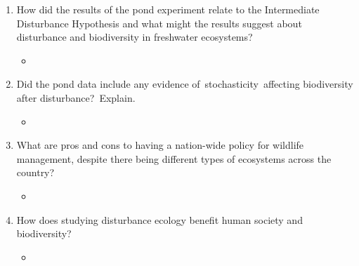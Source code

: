 \documentclass{article}
\begin{document}
\begin{enumerate}
  \item How did the results of the pond experiment relate to the Intermediate Disturbance Hypothesis and what might the results suggest about disturbance and biodiversity in freshwater ecosystems?
  \begin{itemize}
    \item
  \end{itemize}
  \item Did the pond data include any evidence of stochasticity affecting biodiversity after disturbance? Explain.
  \begin{itemize}
    \item
  \end{itemize}
  \item What are pros and cons to having a nation-wide policy for wildlife management, despite there being different types of ecosystems across the country?
  \begin{itemize}
    \item
  \end{itemize}
  \item How does studying disturbance ecology benefit human society and biodiversity?
  \begin{itemize}
    \item
  \end{itemize}
\end{enumerate}
\end{document}
